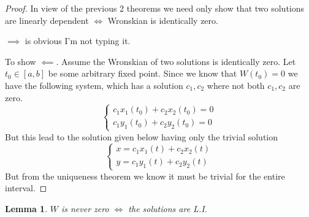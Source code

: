 \documentclass[oneside,11pt,pdftex,final]{book}%
\numberwithin{equation}{section}
\newtheorem{lemma}[theorem]{Lemma}
\newtheorem{example}[theorem]{Example}
\numberwithin{section}{chapter}
\numberwithin{equation}{chapter}
\begin{document}
\begin{proof}
	In view of the previous 2 theorems we need only show that two solutions are linearly dependent $ \iff $ Wronskian is identically zero.
	
	 $ \implies $ is obvious I'm not typing it.
	
	To show $ \impliedby $. Assume the Wronskian of two solutions is identically zero. Let $ t_0 \in [a,b] $ be some arbitrary fixed point. Since we know that $ W(t_0) =0$ we have the following system, which has a solution $ c_1,c_2 $ where not both $ c_1,c_2 $ are zero.
	\[ \begin{cases}
		c_1x_1(t_0)+c_2x_2(t_0)=0\\
		c_1y_1(t_0)+c_2y_2(t_0)=0
	\end{cases} \]	
	But this lead to the solution given below having only the trivial solution
	\[ \begin{cases}
		x=c_1x_1(t)+c_2x_2(t)\\
		y=c_1y_1(t)+c_2y_2(t)
	\end{cases} \]
	But from the uniqueness theorem we know it must be trivial for the entire interval.
\end{proof}
\begin{lemma}
	$ W $ is never zero $ \iff  $ the solutions are L.I.
\end{lemma}

%
\end{document}
